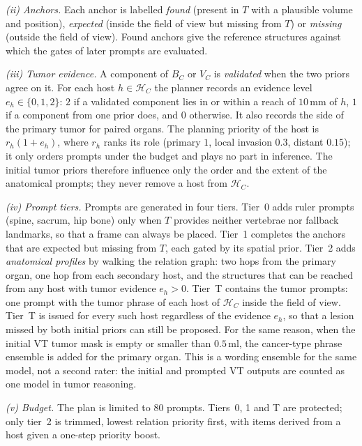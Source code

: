\documentclass[fleqn,10pt]{olplainarticle}
\begin{document}
\emph{(ii) Anchors.} Each anchor is labelled \emph{found} (present in $T$ with a plausible volume and position),
\emph{expected} (inside the field of view but missing from $T$) or \emph{missing} (outside the field of view). Found
anchors give the reference structures against which the gates of later prompts are evaluated.

\emph{(iii) Tumor evidence.} A component of $B_C$ or $V_C$ is \emph{validated} when the two priors agree on it. For each
host $h\in\mathcal{H}_C$ the planner records an evidence level $e_h\in\{0,1,2\}$: $2$ if a validated component lies in
or within a reach of $10$\,mm of $h$, $1$ if a component from one prior does, and $0$ otherwise. It also records the
side of the primary tumor for paired organs. The planning priority of the host is $r_h(1+e_h)$, where $r_h$ ranks its role
(primary $1$, local invasion $0.3$, distant $0.15$); it only orders prompts under the budget and plays no part in
inference. The initial tumor priors therefore influence only the order and the extent of the anatomical
prompts; they never remove a host from $\mathcal{H}_C$.

\emph{(iv) Prompt tiers.} Prompts are generated in four tiers. Tier~0 adds ruler prompts (spine, sacrum, hip bone) only
when $T$ provides neither vertebrae nor fallback landmarks, so that a frame can always be placed. Tier~1 completes the anchors that are expected but missing from $T$, each gated by its
spatial prior. Tier~2 adds \emph{anatomical profiles} by walking the relation graph: two hops from the primary organ,
one hop from each secondary host, and the structures that can be reached from any host with tumor evidence
$e_h>0$. Tier~T contains the tumor prompts: one prompt with the tumor phrase of each host of $\mathcal{H}_C$ inside the
field of view. Tier~T is issued for every such host regardless of the evidence $e_h$, so that a lesion missed by both
initial priors can still be proposed. For the same reason, when the initial VT tumor mask is empty or smaller than
$0.5$\,ml, the cancer-type phrase ensemble is added for the primary organ. This is a wording ensemble for the same
model, not a second rater: the initial and prompted VT outputs are counted as one model in tumor reasoning.

\emph{(v) Budget.} The plan is limited to $80$ prompts. Tiers~0, 1 and T are protected; only tier~2 is trimmed, lowest relation
priority first, with items derived from a host given a one-step priority boost.
\end{document}
